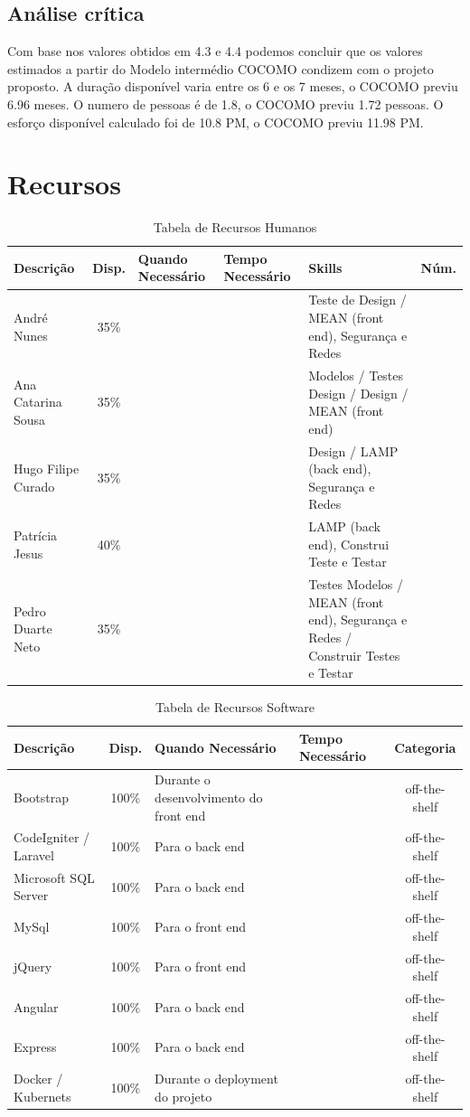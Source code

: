 \documentclass[a4paper]{report}
\begin{document}
\subsection{Análise crítica}
\label{AC}
Com base nos valores obtidos em 4.3 e 4.4 podemos concluir que os valores estimados a partir do Modelo intermédio COCOMO condizem com o projeto proposto.
A duração disponível varia entre os 6 e os 7 meses, o COCOMO previu 6.96 meses.
O numero de pessoas é de 1.8, o COCOMO previu 1.72 pessoas.
O esforço disponível calculado foi de 10.8 PM, o COCOMO previu 11.98 PM.
\pagebreak
\section{Recursos}
\begin{table}[h]
\centering
\begin{tabularx}{\textwidth}{X|c|X|X|X|c}
\textbf{Descrição} & \textbf{Disp.} & \textbf{Quando Necessário} & \textbf{Tempo Necessário} & \textbf{Skills} & \textbf{Núm.} \\ \hline
André Nunes & 35\% &  &  & Teste de Design / MEAN (front end), Segurança e Redes &  \\ \hline
Ana Catarina Sousa & 35\% &  &  & Modelos / Testes Design / Design / MEAN (front end) &  \\ \hline
Hugo Filipe Curado & 35\% &  &  & Design / LAMP (back end), Segurança e Redes &  \\ \hline
Patrícia Jesus & 40\% &  &  & LAMP (back end), Construi Teste e Testar &  \\ \hline
Pedro Duarte Neto & 35\% &  &  & Testes Modelos / MEAN (front end), Segurança e Redes / Construir Testes e Testar &  \\
\end{tabularx}
\caption{Tabela de Recursos Humanos}
\label{TabRH}
\end{table}
\begin{table}[h]
\centering
\begin{tabularx}{\textwidth}{X|c|X|X|c}
\textbf{Descrição} & \textbf{Disp.} & \textbf{Quando Necessário} & \textbf{Tempo Necessário} & \textbf{Categoria} \\ \hline
Bootstrap & \multicolumn{1}{c|}{100\%} & Durante o desenvolvimento do front end &  & off-the-shelf \\ \hline
CodeIgniter / Laravel & 100\% & Para o back end &  & off-the-shelf \\ \hline
Microsoft SQL Server & \multicolumn{1}{c|}{100\%} & Para o back end &  & off-the-shelf \\ \hline
MySql & 100\% & Para o front end &  & off-the-shelf \\ \hline
jQuery & 100\% & Para o front end &  & off-the-shelf \\ \hline
Angular & 100\% & Para o back end &  & off-the-shelf \\ \hline
Express & 100\% & Para o back end &  & off-the-shelf \\ \hline
Docker / Kubernets & \multicolumn{1}{c|}{100\%} & Durante o deployment do projeto &  & off-the-shelf \\
\end{tabularx}
\caption{Tabela de Recursos Software}
\label{TabRS}
\end{table}
\end{document}

